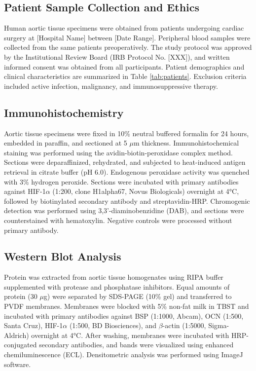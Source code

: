 \documentclass[materials,article,submit,moreauthors,pdftex]{Definitions/mdpi}
\begin{document}
\subsection{Patient Sample Collection and Ethics}

Human aortic tissue specimens were obtained from patients undergoing cardiac surgery at [Hospital Name] between [Date Range]. Peripheral blood samples were collected from the same patients preoperatively. The study protocol was approved by the Institutional Review Board (IRB Protocol No. [XXX]), and written informed consent was obtained from all participants. Patient demographics and clinical characteristics are summarized in Table \ref{tab:patients}. Exclusion criteria included active infection, malignancy, and immunosuppressive therapy.

\subsection{Immunohistochemistry}

Aortic tissue specimens were fixed in 10\% neutral buffered formalin for 24 hours, embedded in paraffin, and sectioned at 5 $\mu$m thickness. Immunohistochemical staining was performed using the avidin-biotin-peroxidase complex method. Sections were deparaffinized, rehydrated, and subjected to heat-induced antigen retrieval in citrate buffer (pH 6.0). Endogenous peroxidase activity was quenched with 3\% hydrogen peroxide. Sections were incubated with primary antibodies against HIF-1$\alpha$ (1:200, clone H1alpha67, Novus Biologicals) overnight at 4°C, followed by biotinylated secondary antibody and streptavidin-HRP. Chromogenic detection was performed using 3,3'-diaminobenzidine (DAB), and sections were counterstained with hematoxylin. Negative controls were processed without primary antibody.

\subsection{Western Blot Analysis}

Protein was extracted from aortic tissue homogenates using RIPA buffer supplemented with protease and phosphatase inhibitors. Equal amounts of protein (30 $\mu$g) were separated by SDS-PAGE (10\% gel) and transferred to PVDF membranes. Membranes were blocked with 5\% non-fat milk in TBST and incubated with primary antibodies against BSP (1:1000, Abcam), OCN (1:500, Santa Cruz), HIF-1$\alpha$ (1:500, BD Biosciences), and $\beta$-actin (1:5000, Sigma-Aldrich) overnight at 4°C. After washing, membranes were incubated with HRP-conjugated secondary antibodies, and bands were visualized using enhanced chemiluminescence (ECL). Densitometric analysis was performed using ImageJ software.
\end{document}
